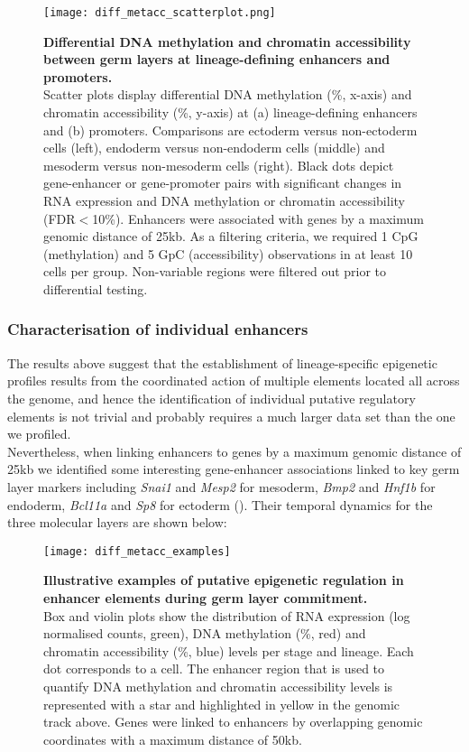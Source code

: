 \begin{figure}[H]
	\centering
	\texttt{[image: diff\_metacc\_scatterplot.png]}
	\caption[]{
	\textbf{Differential DNA methylation and chromatin accessibility between germ layers at lineage-defining enhancers and promoters.} \\
	Scatter plots display differential DNA methylation (\%, x-axis) and chromatin accessibility (\%, y-axis) at (a) lineage-defining enhancers and (b) promoters. Comparisons are ectoderm versus non-ectoderm cells (left), endoderm versus non-endoderm cells (middle) and mesoderm versus non-mesoderm cells (right). Black dots depict gene-enhancer or gene-promoter pairs with significant changes in RNA expression and DNA methylation or chromatin accessibility (FDR$<$10\%). Enhancers were associated with genes by a maximum genomic distance of 25kb. As a filtering criteria, we required 1 CpG (methylation) and 5 GpC (accessibility) observations in at least 10 cells per group. Non-variable regions were filtered out prior to differential testing.
	}
	\label{fig:diff_metacc_scatterplot}
\end{figure}

\subsubsection{Characterisation of individual enhancers}

The results above suggest that the establishment of lineage-specific epigenetic profiles results from the coordinated action of multiple elements located all across the genome, and hence the identification of individual putative regulatory elements is not trivial and probably requires a much larger data set than the one we profiled.\\
Nevertheless, when linking enhancers to genes by a maximum genomic distance of 25kb we identified some interesting gene-enhancer associations linked to key germ layer markers including \textit{Snai1} and \textit{Mesp2} for mesoderm, \textit{Bmp2} and \textit{Hnf1b} for endoderm, \textit{Bcl11a} and \textit{Sp8} for ectoderm (). Their temporal dynamics for the three molecular layers are shown below:

\begin{figure}[H]
	\centering
	\texttt{[image: diff\_metacc\_examples]}
	\caption[]{
	\textbf{Illustrative examples of putative epigenetic regulation in enhancer elements during germ layer commitment.} \\
	Box and violin plots show the distribution of RNA expression (log normalised counts, green), DNA methylation (\%, red) and chromatin accessibility (\%, blue) levels per stage and lineage. Each dot corresponds to a cell. The enhancer region that is used to quantify DNA methylation and chromatin accessibility levels is represented with a star and highlighted in yellow in the genomic track above. Genes were linked to enhancers by overlapping genomic coordinates with a maximum distance of 50kb.}
	\label{fig:diff_metacc_examples}
\end{figure}



